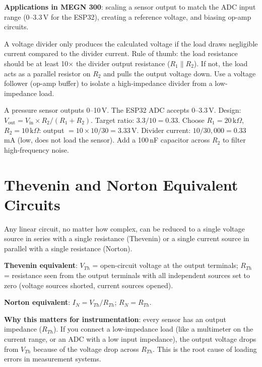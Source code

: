 \documentclass[11pt,letterpaper,twoside,openany]{book}
\begin{document}
\textbf{Applications in MEGN 300}: scaling a sensor output to match the ADC input range (0--3.3\,V for the ESP32), creating a reference voltage, and biasing op-amp circuits.

\begin{warningbox}
A voltage divider only produces the calculated voltage if the load draws negligible current compared to the divider current. Rule of thumb: the load resistance should be at least 10$\times$ the divider output resistance ($R_1 \| R_2$). If not, the load acts as a parallel resistor on $R_2$ and pulls the output voltage down. Use a voltage follower (op-amp buffer) to isolate a high-impedance divider from a low-impedance load.
\end{warningbox}

\begin{examplebox}
A pressure sensor outputs 0--10\,V. The ESP32 ADC accepts 0--3.3\,V. Design: $V_{\text{out}} = V_{\text{in}} \times R_2/(R_1 + R_2)$. Target ratio: $3.3/10 = 0.33$. Choose $R_1 = 20\,\text{k}\Omega$, $R_2 = 10\,\text{k}\Omega$: output $= 10 \times 10/30 = 3.33$\,V. Divider current: $10/30{,}000 = 0.33$\,mA (low, does not load the sensor). Add a 100\,nF capacitor across $R_2$ to filter high-frequency noise.
\end{examplebox}

\section{Thevenin and Norton Equivalent Circuits}

Any linear circuit, no matter how complex, can be reduced to a single voltage source in series with a single resistance (Thevenin) or a single current source in parallel with a single resistance (Norton).

\textbf{Thevenin equivalent}: $V_{Th}$ = open-circuit voltage at the output terminals; $R_{Th}$ = resistance seen from the output terminals with all independent sources set to zero (voltage sources shorted, current sources opened).

\textbf{Norton equivalent}: $I_N = V_{Th}/R_{Th}$; $R_N = R_{Th}$.

\textbf{Why this matters for instrumentation}: every sensor has an output impedance ($R_{Th}$). If you connect a low-impedance load (like a multimeter on the current range, or an ADC with a low input impedance), the output voltage drops from $V_{Th}$ because of the voltage drop across $R_{Th}$. This is the root cause of loading errors in measurement systems.
\end{document}
